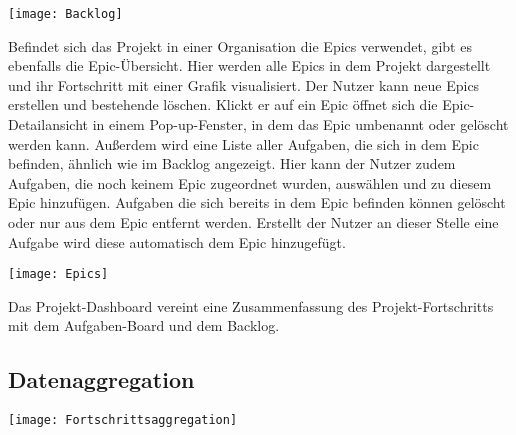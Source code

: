 \vspace{20pt}
\begin{center}
    \begin{minipage}{\linewidth}
        \texttt{[image: Backlog]}
    \end{minipage}
\end{center}
\vspace{20pt}

Befindet sich das Projekt in einer Organisation die Epics verwendet, gibt es ebenfalls die Epic-Übersicht. Hier werden alle Epics in dem Projekt dargestellt und ihr Fortschritt mit einer Grafik visualisiert. Der Nutzer kann neue Epics erstellen und bestehende löschen. Klickt er auf ein Epic öffnet sich die Epic-Detailansicht in einem Pop-up-Fenster, in dem das Epic umbenannt oder gelöscht werden kann. Außerdem wird eine Liste aller Aufgaben, die sich in dem Epic befinden, ähnlich wie im Backlog angezeigt. Hier kann der Nutzer zudem Aufgaben, die noch keinem Epic zugeordnet wurden, auswählen und zu diesem Epic hinzufügen. Aufgaben die sich bereits in dem Epic befinden können gelöscht oder nur aus dem Epic entfernt werden. Erstellt der Nutzer an dieser Stelle eine Aufgabe wird diese automatisch dem Epic hinzugefügt.

\vspace{20pt}
\begin{center}
    \begin{minipage}{\linewidth}
        \texttt{[image: Epics]}
    \end{minipage}
\end{center}
\vspace{20pt}

Das Projekt-Dashboard vereint eine Zusammenfassung des Projekt-Fortschritts mit dem Aufgaben-Board und dem Backlog.

\subsection{Datenaggregation}

\vspace{20pt}
\begin{center}
    \begin{minipage}{0.8\linewidth}
        \texttt{[image: Fortschrittsaggregation]}
    \end{minipage}
\end{center}
\vspace{20pt}

